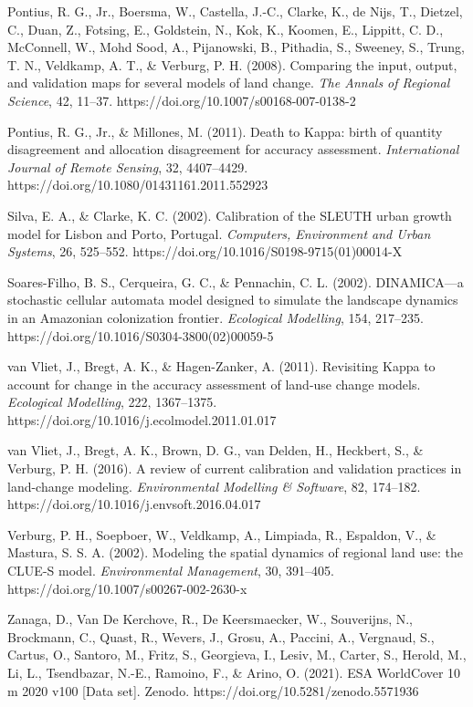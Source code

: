 \documentclass[
]{article}
\begin{document}
Pontius, R. G., Jr., Boersma, W., Castella, J.-C., Clarke, K., de Nijs,
T., Dietzel, C., Duan, Z., Fotsing, E., Goldstein, N., Kok, K., Koomen,
E., Lippitt, C. D., McConnell, W., Mohd Sood, A., Pijanowski, B.,
Pithadia, S., Sweeney, S., Trung, T. N., Veldkamp, A. T., \& Verburg, P.
H. (2008). Comparing the input, output, and validation maps for several
models of land change. \emph{The Annals of Regional Science}, 42,
11--37. https://doi.org/10.1007/s00168-007-0138-2

Pontius, R. G., Jr., \& Millones, M. (2011). Death to Kappa: birth of
quantity disagreement and allocation disagreement for accuracy
assessment. \emph{International Journal of Remote Sensing}, 32,
4407--4429. https://doi.org/10.1080/01431161.2011.552923

Silva, E. A., \& Clarke, K. C. (2002). Calibration of the SLEUTH urban
growth model for Lisbon and Porto, Portugal. \emph{Computers,
Environment and Urban Systems}, 26, 525--552.
https://doi.org/10.1016/S0198-9715(01)00014-X

Soares-Filho, B. S., Cerqueira, G. C., \& Pennachin, C. L. (2002).
DINAMICA---a stochastic cellular automata model designed to simulate the
landscape dynamics in an Amazonian colonization frontier.
\emph{Ecological Modelling}, 154, 217--235.
https://doi.org/10.1016/S0304-3800(02)00059-5

van Vliet, J., Bregt, A. K., \& Hagen-Zanker, A. (2011). Revisiting
Kappa to account for change in the accuracy assessment of land-use
change models. \emph{Ecological Modelling}, 222, 1367--1375.
https://doi.org/10.1016/j.ecolmodel.2011.01.017

van Vliet, J., Bregt, A. K., Brown, D. G., van Delden, H., Heckbert, S.,
\& Verburg, P. H. (2016). A review of current calibration and validation
practices in land-change modeling. \emph{Environmental Modelling \&
Software}, 82, 174--182. https://doi.org/10.1016/j.envsoft.2016.04.017

Verburg, P. H., Soepboer, W., Veldkamp, A., Limpiada, R., Espaldon, V.,
\& Mastura, S. S. A. (2002). Modeling the spatial dynamics of regional
land use: the CLUE-S model. \emph{Environmental Management}, 30,
391--405. https://doi.org/10.1007/s00267-002-2630-x

Zanaga, D., Van De Kerchove, R., De Keersmaecker, W., Souverijns, N.,
Brockmann, C., Quast, R., Wevers, J., Grosu, A., Paccini, A., Vergnaud,
S., Cartus, O., Santoro, M., Fritz, S., Georgieva, I., Lesiv, M.,
Carter, S., Herold, M., Li, L., Tsendbazar, N.-E., Ramoino, F., \&
Arino, O. (2021). ESA WorldCover 10 m 2020 v100 {[}Data set{]}. Zenodo.
https://doi.org/10.5281/zenodo.5571936
\end{document}
